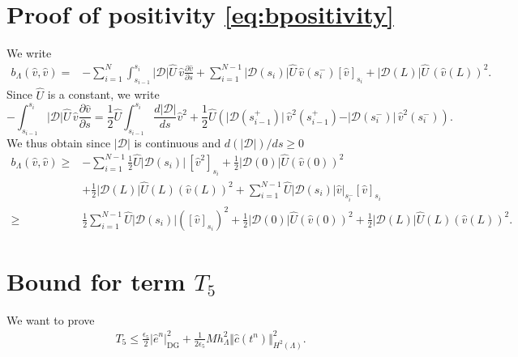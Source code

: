 \documentclass[pdflatex,sn-mathphys-num]{sn-jnl}%
\newcommand{\DG}{\mathrm{DG}}
\theoremstyle{thmstyleone}%
\theoremstyle{thmstyletwo}%
\theoremstyle{thmstylethree}%
\begin{document}
\begin{appendices}
\section{Proof of positivity \eqref{eq:bpositivity}}
\label{sec:appc}
%
We write
\begin{align*}
b_\Lambda(\hat v, \hat v) = & 
-\sum_{i=1}^{N} \int_{s_{i-1}}^{s_i}|\mathcal{D}|\hat U \, \hat v\frac{\partial \hat v}{\partial s} 
    +\sum_{i=1}^{  N-1 } \vert\mathcal{D}(s_i)\vert
    \hat U \, \hat v(s_i^-)  [\hat v]_{s_i} 
     +|\mathcal{D}(L)| \hat U \, (\hat v(L))^2.
\end{align*}
Since $\hat U$ is a constant, we write
\[
 -\int_{s_{i-1}}^{s_i}|\mathcal{D}|\hat U\, \hat v \frac{\partial \hat v}{\partial s} = \frac12 \hat U 
 \int_{s_{i-1}}^{s_i} \frac{d|\mathcal{D}|}{ds} \hat v^2
 + \frac12 \hat U \left( \vert \mathcal{D}(s_{i-1}^+)\vert \, \hat v^2(s_{i-1}^+) -
 \vert \mathcal{D}(s_{i}^-)\vert \, \hat v^2(s_{i}^-)\right).
 \]
We thus obtain since $\vert \mathcal{D}\vert$ is continuous and $d(\vert \mathcal{D}\vert)/ds\geq 0$
\begin{align*}
b_\Lambda(\hat v, \hat v) \geq  &
-\sum_{i=1}^{N-1} \frac12 \hat U \vert \mathcal{D}(s_i)\vert \, [\hat v^2]_{s_i}
+\frac12 \vert \mathcal{D}(0)\vert \hat U (\hat v(0))^2\\
& +\frac12 \vert \mathcal{D}(L)\vert \hat U(L) (\hat v(L))^2
 +\sum_{i=1}^{  N-1 } \hat U \vert \mathcal{D}(s_i)\vert  \hat v|_{s_i^-} [\hat v]_{s_i}\\
 \geq  &
\frac12 \sum_{i=1}^{N-1}  \hat U \vert \mathcal{D}(s_i)\vert ([\hat v]_{s_i})^2
+\frac12 \vert \mathcal{D}(0)\vert \hat U (\hat v(0))^2
 +\frac12 \vert \mathcal{D}(L)\vert \hat U(L) (\hat v(L))^2.
\end{align*}
\section{Bound for term $T_5$}
\label{sec:appe}
We want to prove
\begin{align*}
T_5 %
\leq  \frac{\epsilon_5}{2} 
\vert \hat e^n \vert_{\DG}^2
+ \frac{1}{2 \epsilon_5} M h_\Lambda^2 \Vert \hat c(t^n) \Vert_{H^2(\Lambda)}^2.
\end{align*}


\end{appendices}
\end{document}
